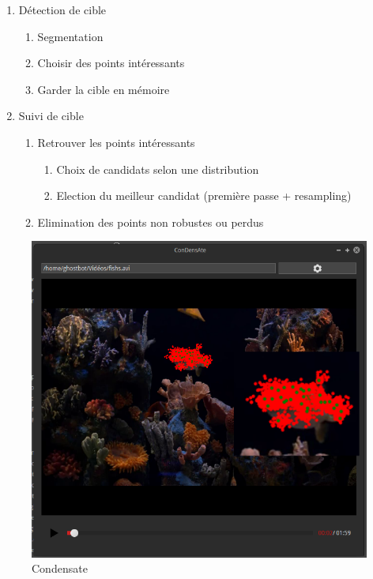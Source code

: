 \documentclass[a4paper,12pt]{report}
\begin{document}
\begin{enumerate}
	\item Détection de cible
	\begin{enumerate}
		\item Segmentation
		\item Choisir des points intéressants
		\item Garder la cible en mémoire
	\end{enumerate}
	\item Suivi de cible
	\begin{enumerate}
		\item Retrouver les points intéressants
		\begin{enumerate}
			\item Choix de candidats selon une distribution
			\item Election du meilleur candidat (première passe + resampling)
		\end{enumerate}
		\item Elimination des points non robustes ou perdus
	\end{enumerate}
\end{enumerate}



\begin{figure}[hbtp]
\centering
\includegraphics[scale=0.5]{screenshots/condensate14.png}
\caption{Condensate}
\end{figure}
\end{document}
